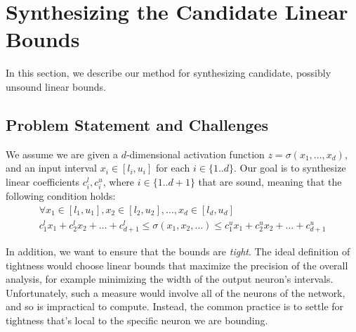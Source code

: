 
\section{Synthesizing the Candidate Linear Bounds}
\label{onlinesyn:sec:method-1}

In this section, we describe our method for synthesizing candidate, possibly
unsound linear bounds.

\subsection{Problem Statement and Challenges}


We assume we are given a $ d $-dimensional activation function $ z =
\sigma(x_1,...,x_d) $, and an input interval $ x_i \in [l_i, u_i] $ for each $ i
\in \{1..d\} $. Our goal is to synthesize linear coefficients $ c^l_i, c^u_i$, where $i
\in \{1..d+1\} $ that are sound, meaning that the following condition holds:
\begin{equation} \label{onlinesyn:eq:generalsound}
\begin{gathered}
\forall x_1 \in [l_1, u_1], x_2 \in [l_2, u_2], \dots, x_d \in [l_d, u_d]\\
c^l_1x_1 + c^l_2x_2 + \dots + c^l_{d+1}
\leq \sigma(x_1, x_2, \dots) \leq
c^u_1x_1 + c^u_2x_2 + \dots + c^u_{d+1}
\end{gathered}
\end{equation}

In addition, we want to ensure that the bounds are \textit{tight}. The ideal
definition of tightness would choose linear bounds that maximize the precision
of the overall analysis, for example minimizing the width of the output
neuron's intervals.
%
Unfortunately, such a measure would involve all of the neurons of the network,
and so is impractical to compute.
Instead, the common practice is to settle for tightness that's local to the specific neuron we are
bounding.

